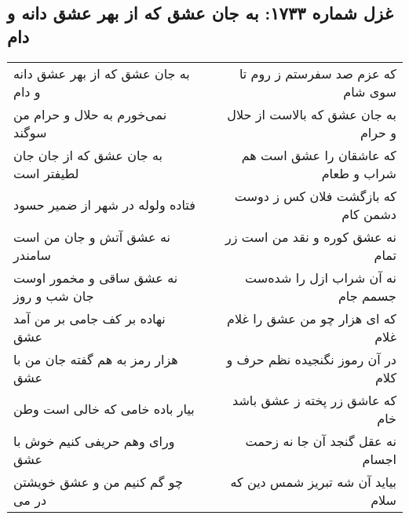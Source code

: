 \begin{center}
\section*{غزل شماره ۱۷۳۳: به جان عشق که از بهر عشق دانه و دام}
\label{sec:1733}
\begin{longtable}{l p{0.5cm} r}
به جان عشق که از بهر عشق دانه و دام
&&
که عزم صد سفرستم ز روم تا سوی شام
\\
نمی‌خورم به حلال و حرام من سوگند
&&
به جان عشق که بالاست از حلال و حرام
\\
به جان عشق که از جان جان لطیفتر است
&&
که عاشقان را عشق است هم شراب و طعام
\\
فتاده ولوله در شهر از ضمیر حسود
&&
که بازگشت فلان کس ز دوست دشمن کام
\\
نه عشق آتش و جان من است سامندر
&&
نه عشق کوره و نقد من است زر تمام
\\
نه عشق ساقی و مخمور اوست جان شب و روز
&&
نه آن شراب ازل را شده‌ست جسمم جام
\\
نهاده بر کف جامی بر من آمد عشق
&&
که ای هزار چو من عشق را غلام غلام
\\
هزار رمز به هم گفته جان من با عشق
&&
در آن رموز نگنجیده نظم حرف و کلام
\\
بیار باده خامی که خالی است وطن
&&
که عاشق زر پخته ز عشق باشد خام
\\
ورای وهم حریفی کنیم خوش با عشق
&&
نه عقل گنجد آن جا نه زحمت اجسام
\\
چو گم کنیم من و عشق خویشتن در می
&&
بیاید آن شه تبریز شمس دین که سلام
\\
\end{longtable}
\end{center}
